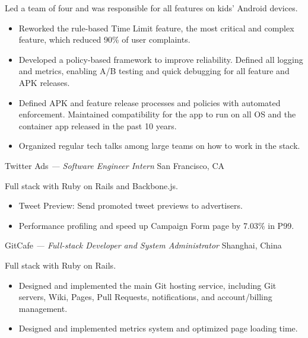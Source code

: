 \documentclass[]{friggeri-cv}
\begin{document}
\begin{entrylist}
{    Led a team of four and was responsible for all features on kids' Android devices.

    \begin{itemize}
      \item Reworked the rule-based Time Limit feature, the most critical and complex feature,
      which reduced 90\% of user complaints.
      \item Developed a policy-based framework to improve reliability.
      Defined all logging and metrics,
      enabling A/B testing and quick debugging for all feature and APK releases.
      \item Defined APK and feature release processes and policies with automated enforcement.
      Maintained compatibility for the app to run on all OS and the container app released in the past 10 years.
      \item Organized regular tech talks among large teams on how to work in the stack.
    \end{itemize}
  }
  {Twitter Ads \emph{--- Software Engineer Intern}}
  {San Francisco, CA}
  {
    Full stack with Ruby on Rails and Backbone.js.\@
    \begin{itemize}
      \item Tweet Preview: Send promoted tweet previews to advertisers.
      \item Performance profiling and speed up Campaign Form page by 7.03\% in P99.
    \end{itemize}
  }
  {GitCafe \emph{--- Full-stack Developer and System Administrator}}
  {Shanghai, China}
  {
    Full stack with Ruby on Rails.
    \begin{itemize}
      \item Designed and implemented the main Git hosting service, including Git servers, Wiki, Pages,
      Pull Requests, notifications, and account/billing management.
      \item Designed and implemented metrics system and optimized page loading time.
    \end{itemize}
  }
\end{entrylist}

\end{document}
